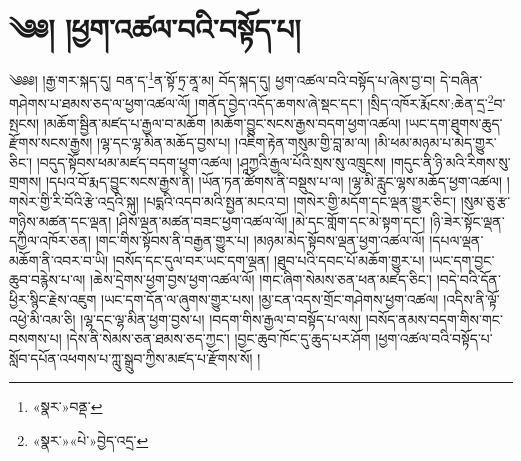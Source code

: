 \chapter{༄༅། །ཕྱག་འཚལ་བའི་བསྟོད་པ།}༄༅༅། །རྒྱ་གར་སྐད་དུ། བན་ད་\footnote{«སྣར་»བནྡ་}ན་སྟོ་ཏྲ་ནཱ་མ། བོད་སྐད་དུ། ཕྱག་འཚལ་བའི་བསྟོད་པ་ཞེས་བྱ་བ། དེ་བཞིན་གཤེགས་པ་ཐམས་ཅད་ལ་ཕྱག་འཚལ་ལོ། །གནོད་བྱེད་འདོད་ཆགས་ཞེ་སྡང་དང་། །སྲིད་འཁོར་རྨོངས་:ཆེན་དྲ་\footnote{«སྣར་»«པེ་»བྱེད་འདྲ་}བ་སྤངས། །མཆོག་སྦྱིན་མཛད་པ་རྒྱལ་བ་མཆོག །མཆོག་བྱུང་སངས་རྒྱས་བདག་ཕྱག་འཚལ། །ཡང་དག་ཐུགས་ཆུད་རྫོགས་སངས་རྒྱས། །ལྷ་དང་ལྷ་མིན་མཆོད་བྱས་པ། །འཇིག་རྟེན་གསུམ་གྱི་བླ་མ་ལ། །མི་ཕམ་མཉམ་པ་མེད་གྱུར་ཅིང་། །བདུད་སྟོབས་ཕམ་མཛད་བདག་ཕྱག་འཚལ། །ཤཱཀྱའི་རྒྱལ་པོའི་སྲས་སུ་འཁྲུངས། །གདུང་ནི་ཉི་མའི་རིགས་སུ་གྲགས། །དཔའ་བོ་རྨད་བྱུང་སངས་རྒྱས་ནི། །ཡོན་ཏན་ཚོགས་ནི་བསྡུས་པ་ལ། །ལྷ་མི་རླུང་ལྷས་མཆོད་ཕྱག་འཚལ། །གསེར་གྱི་རི་བོའི་རྩེ་འདྲའི་སྐུ། །པདྨའི་འདབ་མའི་སྤྱན་མངའ་བ། །གསེར་གྱི་མདོག་དང་ལྡན་གྱུར་ཅིང་། །སུམ་ཅུ་རྩ་གཉིས་མཚན་དང་ལྡན། །ཤིས་ལྡན་མཚན་བཟང་ཕྱག་འཚལ་ལོ། །མེ་དང་གློག་དང་མེ་སྟག་དང་། །ཉི་ཟེར་སྟོང་ལྡན་དཀྱིལ་འཁོར་ཅན། །གང་གིས་སྟོབས་ནི་བརྒྱན་གྱུར་པ། །མཉམ་མེད་སྟོབས་ལྡན་ཕྱག་འཚལ་ལོ། །དཔལ་ལྡན་མཆོག་ནི་འབར་བ་ཡི། །བསོད་དང་དུལ་བར་ཡང་དག་ལྡན། །ཐུབ་པའི་དབང་པོ་མཆོག་གྱུར་པ། །ཡང་དག་བྱང་ཆུབ་བརྙེས་པ་ལ། །ཆེས་དྲེགས་ཕྱག་བྱས་ཕྱག་འཚལ་ལོ། །གང་ཞིག་སེམས་ཅན་ཕན་མཛད་ཅིང་། །བདེ་བའི་དོན་ཕྱིར་སྙིང་རྗེས་འཇུག །ཡང་དག་དོན་ལ་ཞུགས་གྱུར་པས། །མྱ་ངན་འདས་གྲོང་གཤེགས་ཕྱག་འཚལ། །འདིས་ནི་ལྟོ་འཕྱེ་མི་འམ་ཅི། །ལྷ་དང་ལྷ་མིན་ཕྱག་བྱས་པ། །བདག་གིས་རྒྱལ་བ་བསྟོད་པ་ལས། །བསོད་ནམས་བདག་གིས་གང་བསགས་པ། །དེས་ནི་སེམས་ཅན་ཐམས་ཅད་ཀྱང་། །བྱང་ཆུབ་ཁོང་དུ་ཆུད་པར་ཤོག །ཕྱག་འཚལ་བའི་བསྟོད་པ་སློབ་དཔོན་འཕགས་པ་ཀླུ་སྒྲུབ་ཀྱིས་མཛད་པ་རྫོགས་སོ། ། 
